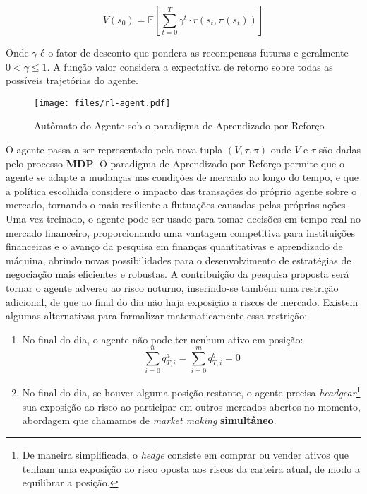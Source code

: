 \begin{itemize}
	\begin{equation*}
		V(s_0) = \mathbb{E}\left[\sum_{t=0}^{T} \gamma^t \cdot r(s_t, \pi(s_t)) \right]
		\end{equation*}
	
	Onde $\gamma$ é o fator de desconto que pondera as recompensas futuras e geralmente $0 < \gamma \leq 1$. A função valor considera a expectativa de retorno sobre todas as possíveis trajetórias do agente.
\end{itemize}

\begin{figure}[H]
	\centering
	\texttt{[image: files/rl-agent.pdf]}
	\caption{Autômato do Agente sob o paradigma de Aprendizado por Reforço}
	\label{fig:rl-agent}
\end{figure}

O agente passa a ser representado pela nova tupla $(V, \tau, \pi)$ onde $V$ e $\tau$ são dadas pelo processo $\mathbf{MDP}$. O paradigma de Aprendizado por Reforço permite que o agente se adapte a mudanças nas condições de mercado ao longo do tempo, e que a política escolhida considere o impacto das transações do próprio agente sobre o mercado, tornando-o mais resiliente a flutuações causadas pelas próprias ações. Uma vez treinado, o agente pode ser usado para tomar decisões em tempo real no mercado financeiro, proporcionando uma vantagem competitiva para instituições financeiras e o avanço da pesquisa em finanças quantitativas e aprendizado de máquina, abrindo novas possibilidades para o desenvolvimento de estratégias de negociação mais eficientes e robustas. A contribuição da pesquisa proposta será tornar o agente adverso ao risco noturno, inserindo-se também uma restrição adicional, de que ao final do dia não haja exposição a riscos de mercado. 
Existem algumas alternativas para formalizar matematicamente essa restrição:
\begin{enumerate}
    \item No final do dia, o agente não pode ter nenhum ativo em posição: 
    \begin{equation} \label{overnight_restriction}
        \sum_{i = 0}^{n} q_{T, i}^{a}  = \sum_{i=0}^{m} q_{T, i}^{b} = 0
    \end{equation}
    \item No final do dia, se houver alguma posição restante, o agente precisa \textit{headgear}\footnote{De maneira simplificada, o \textit{hedge} consiste em comprar ou vender ativos que tenham uma exposição ao risco oposta aos riscos da carteira atual, de modo a equilibrar a posição.} sua exposição ao risco ao participar em outros mercados abertos no momento, abordagem que chamamos de \textit{market making} \textbf{simultâneo}.
\end{enumerate}
